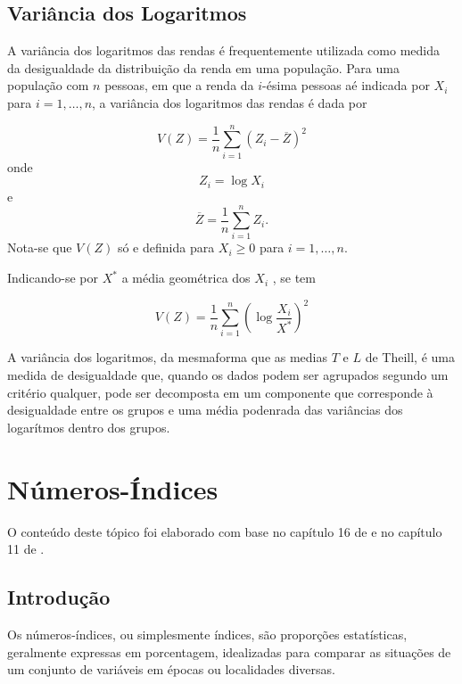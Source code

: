 \documentclass[
]{book}
\begin{document}
\hypertarget{variuxe2ncia-dos-logaritmos}{%
\section{Variância dos Logaritmos}\label{variuxe2ncia-dos-logaritmos}}

A variância dos logaritmos das rendas é frequentemente utilizada como medida da desigualdade da distribuição da renda em uma população. Para uma população com \(n\) pessoas, em que a renda da \(i\)-ésima pessoas aé indicada por \(X_i\) para \(i=1, \ldots, n\), a variância dos logaritmos das rendas é dada por

\[
V(Z) = \dfrac{1}{n} \sum_{i=1}^{n} \left( Z_i - \overline{Z} \right)^2 
\label{eq:VarianciaDosLogaritmos}
\]
onde
\[
Z_i = \log X_i
\]
e
\[
\overline{Z} = \dfrac{1}{n}\sum_{i=1}^{n} Z_i.
\]
Nota-se que \(V(Z)\) só e definida para \(X_i \geq 0\) para \(i=1, \ldots, n\).

Indicando-se por \(X^*\) a média geométrica dos \(X_i\) , se tem

\[
V(Z) = \dfrac{1}{n} \sum_{i=1}^{n} \left( \log \dfrac{X_i}{X^*} \right)^2
\label{eq:VarianciaDosLogaritmosComMediaGeometrica}
\]

A variância dos logaritmos, da mesmaforma que as medias \(T\) e \(L\) de Theill, é uma medida de desigualdade que, quando os dados podem ser agrupados segundo um critério qualquer, pode ser decomposta em um componente que corresponde à desigualdade entre os grupos e uma média podenrada das variâncias dos logarítmos dentro dos grupos.

\hypertarget{nuxfameros-uxedndices}{%
\chapter{Números-Índices}\label{nuxfameros-uxedndices}}

O conteúdo deste tópico foi elaborado com base no capítulo 16 de \citet{Hoffmann2006} e no capítulo 11 de \citet{Sartoris2013}.

\hypertarget{introduuxe7uxe3o}{%
\section{Introdução}\label{introduuxe7uxe3o}}

Os números-índices, ou simplesmente índices, são proporções estatísticas,
geralmente expressas em porcentagem, idealizadas para comparar as situações de
um conjunto de variáveis em épocas ou localidades diversas.
\end{document}
